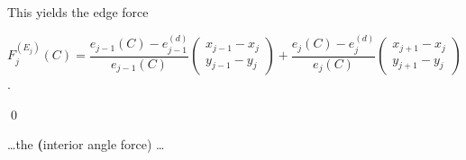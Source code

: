 \begin{proposition}
\begin{center}
	\end{center}
	This yields the edge force 
	\begin{center}
		$F_j^{(E_{j})}(C) = \dfrac{e_{j-1}(C) - e_{j-1}^{(d)}}{e_{j-1}(C)} 
		\begin{pmatrix}  x_{j-1} - x_j \\ y_{j-1} - y_j  \end{pmatrix} + 
		\dfrac{e_{j}(C) - e_{j}^{(d)}}{e_{j}(C)} 
		\begin{pmatrix}  x_{j+1} - x_j \\ y_{j+1} - y_j  \end{pmatrix}$.
	\end{center}
	\qed  
\end{proposition}

\dots the \textbf(interior angle force) \dots

